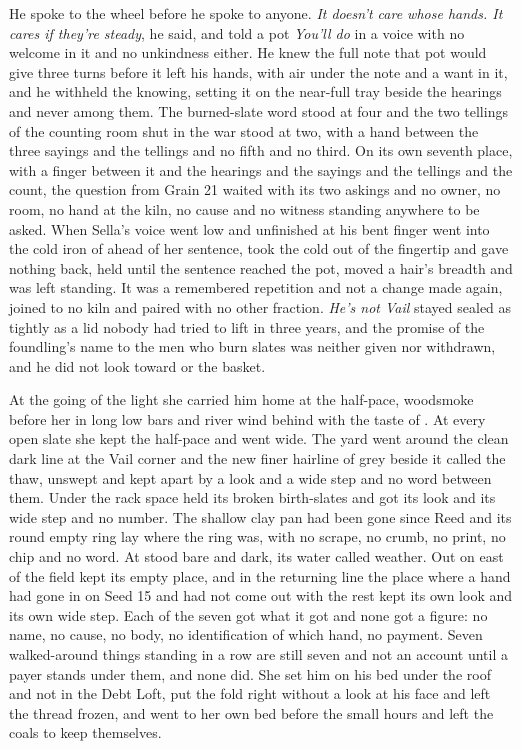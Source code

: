 He spoke to the wheel before he spoke to anyone. \emph{It doesn't care whose hands. It cares if they're steady}, he said, and told a pot \emph{You'll do} in a voice with no welcome in it and no unkindness either. He knew the full note that pot would give three turns before it left his hands, with air under the note and a want in it, and he withheld the knowing, setting it on the near-full tray beside the hearings and never among them. The burned-slate word stood at four and the two tellings of the counting room shut in the war stood at two, with a hand between the three sayings and the tellings and no fifth and no third. On its own seventh place, with a finger between it and the hearings and the sayings and the tellings and the count, the question from Grain 21 waited with its two askings and no owner, no room, no hand at the kiln, no cause and no witness standing anywhere to be asked. When Sella's voice went low and unfinished at  his bent finger went into the cold iron of  ahead of her sentence, took the cold out of the fingertip and gave nothing back, held until the sentence reached the pot, moved a hair's breadth and was left standing. It was a remembered repetition and not a change made again, joined to no kiln and paired with no other fraction. \emph{He's not Vail} stayed sealed as tightly as a lid nobody had tried to lift in three years, and the promise of the foundling's name to the men who burn slates was neither given nor withdrawn, and he did not look toward  or the basket.

At the going of the light she carried him home at the half-pace, woodsmoke before her in long low bars and river wind behind with the taste of . At every open slate she kept the half-pace and went wide. The yard went around the clean dark line at the Vail corner and the new finer hairline of grey beside it called the thaw, unswept and kept apart by a look and a wide step and no word between them. Under  the rack space held its broken birth-slates and got its look and its wide step and no number. The shallow clay pan had been gone since Reed and its round empty ring lay where the ring was, with no scrape, no crumb, no print, no chip and no word. At   stood bare and dark, its water called weather. Out on  east of  the field kept its empty place, and in the returning line the place where a hand had gone in on Seed 15 and had not come out with the rest kept its own look and its own wide step. Each of the seven got what it got and none got a figure: no name, no cause, no body, no identification of which hand, no payment. Seven walked-around things standing in a row are still seven and not an account until a payer stands under them, and none did. She set him on his bed under the roof and not in the Debt Loft, put the fold right without a look at his face and left the thread frozen, and went to her own bed before the small hours and left the coals to keep themselves.

